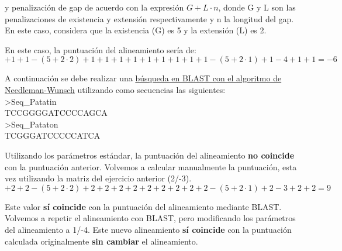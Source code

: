 y penalización de gap de acuerdo con la expresión $G+L \cdot n$, donde G y L son las penalizaciones de existencia y extensión respectivamente y n la longitud del gap. En este caso, considera que la existencia (G) es 5 y la extensión (L) es 2. 

En este caso, la puntuación del alineamiento sería de:
$$+1 +1 -(5 +2 \cdot 2) +1 +1 +1 +1 +1 +1 +1 +1 +1 -(5 +2 \cdot 1) +1 -4 +1 +1 = -6$$

A continuación se debe realizar una \href{https://blast.ncbi.nlm.nih.gov/Blast.cgi?PAGE\_TYPE=BlastSearch&BLAST\_SPEC=GlobalAln}{búsqueda en BLAST con el algoritmo de Needleman-Wunsch} utilizando como secuencias las siguientes: \\
>Seq\_Patatin\\
TCCGGGGATCCCCAGCA \\
>Seq\_Pataton\\
TCGGGATCCCCCATCA

Utilizando los parámetros estándar, la puntuación del alineamiento \textbf{no coincide} con la puntuación anterior. Volvemos a calcular manualmente la puntuación, esta vez utilizando la matriz del ejercicio anterior (2/-3). 
$$+2 +2 -(5 +2 \cdot 2) +2 +2 +2 +2 +2 +2 +2 +2 +2 -(5 +2 \cdot 1) +2 -3 +2 +2 = 9$$

Este valor \textbf{sí coincide} con la puntuación del alineamiento mediante BLAST. Volvemos a repetir el alineamiento con BLAST, pero modificando los parámetros del alineamiento a 1/-4. Este nuevo alineamiento \textbf{sí coincide} con la puntuación calculada originalmente \textbf{sin cambiar} el alineamiento. 


